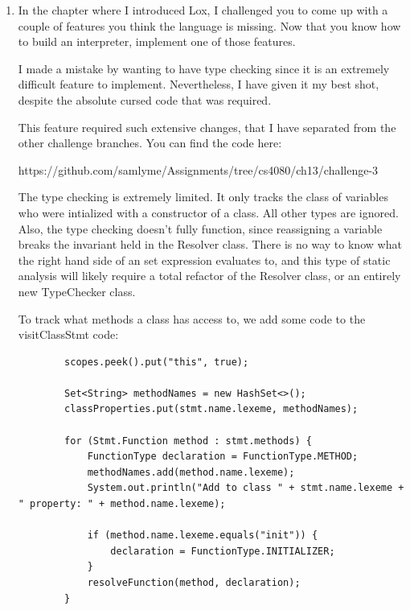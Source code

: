\documentclass{article}
\begin{document}
\begin{enumerate}
{\begin{verbatim}
        if (methods.containsKey(name)) {
            return superclass.findMethodRoot(name).bindInner(methods.get(name));
        }
        return superclass.findMethodRoot(name);
    }
        \end{verbatim}
    }

    \item {
        In the chapter where I introduced Lox, I challenged you to come up with a couple of features you think the language is missing. Now that you know how to build an interpreter, implement one of those features.

        I made a mistake by wanting to have type checking since it is an 
        extremely difficult feature to implement. Nevertheless, I have given it 
        my best shot, despite the absolute cursed code that was required.

        This feature required such extensive changes, that I have separated from 
        the other challenge branches. You can find the code here:

        https://github.com/samlyme/Assignments/tree/cs4080/ch13/challenge-3

        The type checking is extremely limited. It only tracks the class of variables 
        who were intialized with a constructor of a class. All other types are 
        ignored. Also, the type checking doesn't fully function, since reassigning 
        a variable breaks the invariant held in the Resolver class. There is no 
        way to know what the right hand side of an set expression evaluates to,
        and this type of static analysis will likely require a total refactor 
        of the Resolver class, or an entirely new TypeChecker class. 

        To track what methods a class has access to, we add some 
        code to the visitClassStmt code:
        \begin{verbatim}
        scopes.peek().put("this", true);

        Set<String> methodNames = new HashSet<>();
        classProperties.put(stmt.name.lexeme, methodNames);

        for (Stmt.Function method : stmt.methods) {
            FunctionType declaration = FunctionType.METHOD;
            methodNames.add(method.name.lexeme);
            System.out.println("Add to class " + stmt.name.lexeme + " property: " + method.name.lexeme);

            if (method.name.lexeme.equals("init")) {
                declaration = FunctionType.INITIALIZER;
            }
            resolveFunction(method, declaration);
        }
        \end{verbatim}

}
\end{enumerate}
\end{document}
